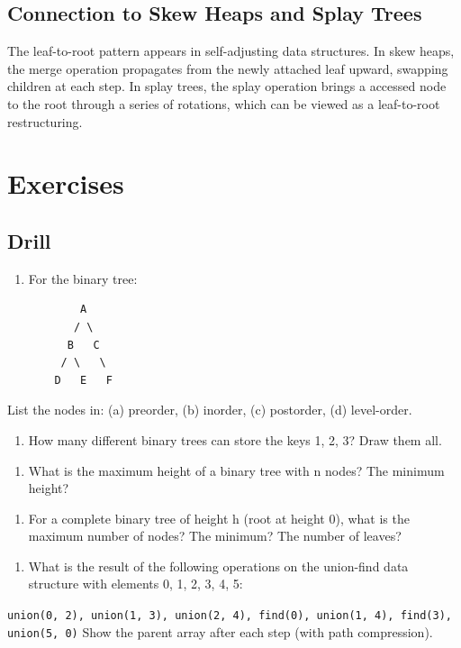 \subsection{Connection to Skew Heaps and Splay Trees}

The leaf-to-root pattern appears in self-adjusting data structures. In skew heaps, the merge operation propagates from the newly attached leaf upward, swapping children at each step. In splay trees, the splay operation brings a accessed node to the root through a series of rotations, which can be viewed as a leaf-to-root restructuring.

\section{Exercises}

\subsection{Drill}

\begin{enumerate}
\item For the binary tree:
\begin{lstlisting}
        A
       / \
      B   C
     / \   \
    D   E   F
\end{lstlisting}
\end{enumerate}
   List the nodes in: (a) preorder, (b) inorder, (c) postorder, (d) level-order.

\begin{enumerate}
\item How many different binary trees can store the keys {1, 2, 3}? Draw them all.
\end{enumerate}

\begin{enumerate}
\item What is the maximum height of a binary tree with n nodes? The minimum height?
\end{enumerate}

\begin{enumerate}
\item For a complete binary tree of height h (root at height 0), what is the maximum number of nodes? The minimum? The number of leaves?
\end{enumerate}

\begin{enumerate}
\item What is the result of the following operations on the union-find data structure with elements {0, 1, 2, 3, 4, 5}:
\end{enumerate}
   \texttt{union(0, 2), union(1, 3), union(2, 4), find(0), union(1, 4), find(3), union(5, 0)}
   Show the parent array after each step (with path compression).

